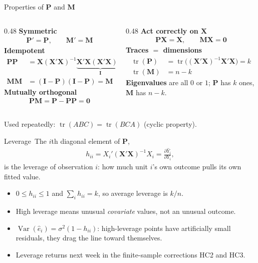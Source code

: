 \documentclass[aspectratio=169,11pt,xcolor=dvipsnames]{beamer}
\DeclareMathOperator{\Var}{Var}
\DeclareMathOperator{\trace}{tr}
\newcommand{\X}{\bm{X}}
\newcommand{\Ix}{\bm{I}}
\newcommand{\zero}{\bm{0}}
\newcommand{\Pm}{\bm{P}}
\newcommand{\Mm}{\bm{M}}
\newcommand{\adv}{\,\raisebox{0.6pt}{\textcolor{accent}{$\bigstar$}}}
\begin{document}
\begin{frame}{Properties of $\Pm$ and $\Mm$\adv}
\begin{columns}[T]
\begin{column}{0.48\textwidth}
\textbf{Symmetric}
\begin{align*}
  \Pm' = \Pm, \qquad \Mm' = \Mm
\end{align*}
\textbf{Idempotent}
\begin{align*}
  \Pm\Pm &= \X(\X'\X)^{-1}\underbrace{\X'\X(\X'\X)^{-1}}_{\Ix}\X' = \Pm\\
  \Mm\Mm &= (\Ix-\Pm)(\Ix-\Pm) = \Mm
\end{align*}
\textbf{Mutually orthogonal}
\begin{align*}
  \Pm\Mm = \Pm - \Pm\Pm = \zero
\end{align*}
\end{column}
\begin{column}{0.48\textwidth}
\textbf{Act correctly on $\X$}
\begin{align*}
  \Pm\X = \X, \qquad \Mm\X = \zero
\end{align*}
\textbf{Traces $=$ dimensions}
\begin{align*}
  \trace(\Pm) &= \trace\big((\X'\X)^{-1}\X'\X\big) = k\\
  \trace(\Mm) &= n - k
\end{align*}
\textbf{Eigenvalues} are all $0$ or $1$; $\Pm$ has $k$ ones, $\Mm$ has $n-k$.
\end{column}
\end{columns}
\vskip2pt
{\footnotesize Used repeatedly: $\trace(ABC)=\trace(BCA)$ (cyclic property).}
\end{frame}

\begin{frame}{Leverage\adv}
The $i$th diagonal element of $\Pm$,
\begin{align*}
  h_{ii} = X_i'(\X'\X)^{-1}X_i = \frac{\partial \hat Y_i}{\partial Y_i},
\end{align*}
is the \alert{leverage} of observation $i$: how much unit $i$'s own outcome pulls
its own fitted value.
\begin{itemize}\itemsep3pt
  \item $0 \leq h_{ii} \leq 1$ and $\sum_i h_{ii} = k$, so average leverage is
        $k/n$.
  \item High leverage means unusual \emph{covariate} values, not an unusual
        outcome.
  \item $\Var(\hat e_i) = \sigma^2(1-h_{ii})$: high-leverage points have
        artificially small residuals, they drag the line toward themselves.
  \item Leverage returns next week in the finite-sample corrections HC2 and HC3.
\end{itemize}
\end{frame}
\end{document}
